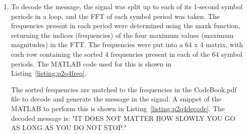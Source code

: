 \documentclass[12pt]{article}
\begin{document}
\begin{enumerate}
    \item To decode the message, the signal was split up to each of its 1-second symbol periods in a loop, and the FFT of each symbol period was taken. The frequencies present in each period were determined using the maxk function, returning the indices (frequencies) of the four maximum values (maximum magnitudes) in the FTT. The frequencies were put into a 64 x 4 matrix, with each row containing the sorted 4 frequencies present in each of the 64 symbol periods. The MATLAB code used for this is shown in Listing~\ref{listing:p2q4freq}.
    
    The sorted frequencies are matched to the frequencies in the CodeBook.pdf file to decode and generate the message in the signal. A snippet of the MATLAB to perform this is shown in Listing~\ref{listing:p2q4decode}. The decoded message is: "IT DOES NOT MATTER HOW SLOWLY YOU GO AS LONG AS YOU DO NOT STOP."
    
\end{enumerate}
\end{document}
